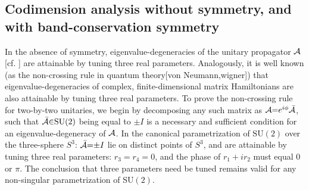 \documentclass[aps, prb, showpacs, twocolumn, notitlepage, superscriptaddress]{revtex4-1}
\begin{document}





\subsection{Codimension analysis without symmetry, and with band-conservation symmetry}


In the absence of symmetry,  eigenvalue-degeneracies of the unitary propagator ${\cal A}$ [cf. ] are attainable by tuning three real parameters. Analogously, it is well known (as the non-crossing rule in quantum theory[von Neumann,wigner]) that eigenvalue-degeneracies of complex, finite-dimensional matrix Hamiltonians are also attainable by tuning three real parameters.
 To prove the non-crossing rule for two-by-two unitaries, we begin by decomposing any such matrix as ${\cal A}{=}e^{i\phi}{\cal \bar{A}}$, such that  ${\cal \bar{A}}{\in}\text{SU}(2)$ being equal to $\pm I$ is a necessary and sufficient condition for an eigenvalue-degeneracy of ${\cal A}$. In the canonical parametrization of $\text{SU}(2)$ over the three-sphere $S^3$: 
${\cal \bar{A}}{=}{\pm}I$ lie on distinct points of $S^3$, and are attainable by tuning three real parameters: $r_3{=}r_4{=}0$, and the phase of $r_1{+}ir_2$ must equal $0$ or $\pi$. The conclusion that three parameters need be tuned remains valid for any  non-singular parametrization of SU$(2)$.


 
\end{document}
